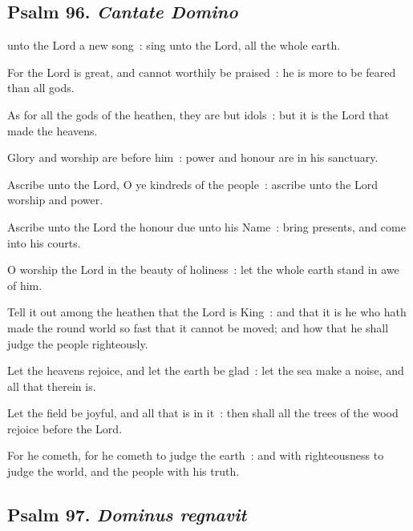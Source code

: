 \subsection{Psalm 96. \textit{Cantate Domino}}


 unto the Lord a new song~: sing unto the Lord, all the whole earth.\par
{}
For the Lord is great, and cannot worthily be praised~: he is more to be feared than all gods.\par
{}As for all the gods of the heathen, they are but idols~: but it is the Lord that made the heavens.\par
{}Glory and worship are before him~: power and honour are in his sanctuary.\par
{}Ascribe unto the Lord, O ye kindreds of the people~: ascribe unto the Lord worship and power.\par
{}Ascribe unto the Lord the honour due unto his Name~: bring presents, and come into his courts.\par
{}O worship the Lord in the beauty of holiness~: let the whole earth stand in awe of him.\par
{}Tell it out among the heathen that the Lord is King~: and that it is he who hath made the round world so fast that it cannot be moved; and how that he shall judge the people righteously.\par
{}Let the heavens rejoice, and let the earth be glad~: let the sea make a noise, and all that therein is.\par
{}Let the field be joyful, and all that is in it~: then shall all the trees of the wood rejoice before the Lord.\par
{}For he cometh, for he cometh to judge the earth~: and with righteousness to judge the world, and the people with his truth.\par


\clearpage
\subsection{Psalm 97. \textit{Dominus regnavit}}

